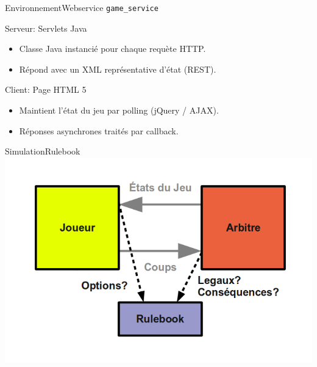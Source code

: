 
\begin{frame}{Environnement}{Webservice \texttt{game\_service}}

\begin{block}{Serveur: Servlets Java}
\begin{itemize}
\item Classe Java instancié pour chaque requète HTTP.
\item Répond avec un XML représentative d'état (REST).
\end{itemize}
\end{block}

\pause

\begin{block}{Client: Page HTML 5}
\begin{itemize}
\item Maintient l'état du jeu par polling (jQuery / AJAX).
\item Réponses asynchrones traités par callback.
\end{itemize}
\end{block}


\end{frame}



\begin{frame}{Simulation}{Rulebook}
\includegraphics[width=\textwidth]{img/env_sim/rulebook}\\
\end{frame}


